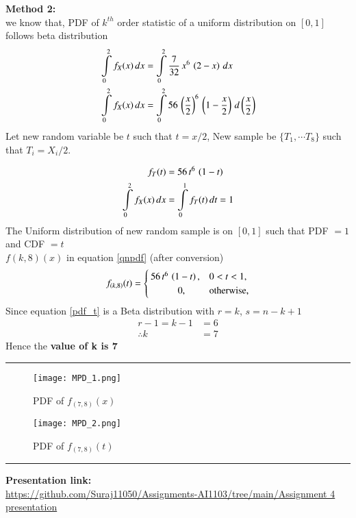 \documentclass[journal,12pt,twocolumn]{IEEEtran}
\begin{document}
\textbf{Method 2:}\\
we know that, PDF of $k^{th}$ order statistic of a uniform distribution on $[0,1]$ follows 
beta distribution
\begin{align}
\int\limits_{0}^{2}f_{X}(x)\,dx &= \int\limits_{0}^{2} \dfrac{7}{32}\,x^{6}\,\left(2-x\right)\,dx \\
\int\limits_{0}^{2}f_{X}(x)\,dx &= \int\limits_{0}^{2} 56\,\left(\dfrac{x}{2}\right)^{6}\,\left(1-\dfrac{x}{2}\right)\,d\left(\dfrac{x}{2}\right)
\end{align}
Let new random variable be $t$ such that $t=x/2$, New sample be $\{T_1,\cdots T_8\}$ such that $T_{i}=X_{i}/2$.

\begin{align}
f_{T}(t) &= 56\,t^{6}\,\left(1-t\right) \\
\int\limits_{0}^{2}f_{X}(x)\,dx &=  \int\limits_{0}^{1}f_{T}(t)\,dt = 1
\end{align}
The Uniform distribution of new random sample is on $[0,1]$ such that   PDF $= 1$ and CDF $= t$ \\
$f(k,8)(x)$ in equation \eqref{qnpdf}  (after conversion)
\begin{align}
f_{(k,8)}(t) =
  \begin{cases}
      56\,t^{6}\,\left(1-t\right),  & 0<t<1, \\ 
      \hspace{1cm}   0,               & \text{otherwise,} 
  \end{cases}
  \label{pdf_t}
\end{align}
Since equation \eqref{pdf_t} is a Beta distribution with $r=k$, $s=n-k+1$  
\begin{align}
r-1 = k-1 &= 6 \\
\therefore k &= 7 
\end{align}
Hence the \textbf{value of k is 7}
\vspace{0.5cm}
\hrule
\begin{figure}[htp]
    \centering
    \texttt{[image: MPD\_1.png]}
    \label{fig:maginal probability density 1}
    \caption{PDF of $f_{(7,8)}(x)$}
\centering
    \texttt{[image: MPD\_2.png]}
    \label{fig:maginal probability density 2}
    \caption{PDF of $f_{(7,8)}(t)$}
\end{figure}
\hrule
\vspace{0.5cm}
\begin{center}
\textbf{Presentation link:} \\
\url{https://github.com/Suraj11050/Assignments-AI1103/tree/main/Assignment 4 presentation}
\end{center}
\end{document}

